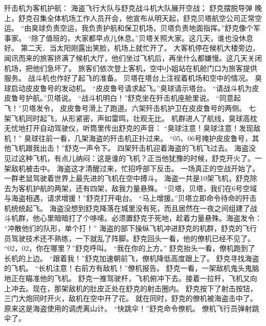 \documentclass[a4paper,12pt,UTF8,twoside]{ctexbook}
\begin{document}
        歼击机为客机护航： 
        海盗飞行大队与舒克战斗机大队展开空战； 
        舒克摆脱导弹   
        晚上，舒克召集全体机场工作人员开会，他宣布从明天起，舒克贝塔航空公司正常空运。 
        “由臭球负责空运，我负责护航和保卫机场，贝塔负责地面指挥。”舒克像个军事家。 
        “除了值班的，大家都早点儿休息。”贝塔关照大家。这几天，谁也没休息好。 
        第二天．当太阳刚露出笑脸，机场上就忙开了。 
        大客机停在候机大楼旁边，闻讯而来的旅客挤满了候机大厅，他们坐过飞机后，再坐什么都嫌慢。这几天关闭机场，把他们急坏了。 
        旅客们依次登上客机，空中小姐站在机舱门口为旅客提供服务。 
        战斗机也作好了起飞的准备。 
        贝塔在塔台上注视着机场和空中的情况。 
        臭球启动皮皮鲁号的发动机。 
        “皮皮鲁号请求起飞。”臭球请示塔台。 
        “请战斗机为皮皮鲁号护航。”贝塔说。 
        “战斗机明白！”舒克坐在歼击机座舱里说。 
        “同意起飞！”贝塔发令， 
        皮皮鲁号滑上了跑道。六架歼击机护卫在皮皮鲁号的两侧。 
        七架飞机同时起飞，从形紧密，声如雷鸣，壮观无比。 
        机群进人了航线，臭球高枕无忧地打开自动驾驶仪，听筒里传出舒克的声音： 
        “臭球注意！臭球注意！发现敌机！” 
        臭球往前一看，几架海盗的歼击机正扑过来。 
        “05、06号掩护皮皮鲁号，其他飞机跟我出击！”舒克一声令下。 
        四架歼击机迎着海盗的飞机飞过去。 
        海盗没见过这种飞机，有点儿纳闷：这是谁的飞机？正当他犹豫的时候，舒克开火了。一架敌机被击中。 
        海盗这才清醒过来，忙招呼部下反击。 
        一场真正的空战开始了。一群老鼠驾驶着世界上最先进的飞机在空中搏斗。 
        海盗一共是10架飞机，舒克除去为客机护航的两架，还有四架，敌我力量悬殊。 
        “贝塔，贝塔，我们在6号空域与海盗相遇，请求增援！”舒克打开电台。 
        “马上增援。”贝塔立即命令待命的歼击机统统起飞。 
        海盗没想到舒克降落在城里没有死，而且居然在一夜之间组建了战斗机群，他心里暗暗打了个哆嗦。必须置舒克于死地，趁着力量悬殊。海盗发令： 
        “冲散他们的队形，单个打！” 
        海盗的部下操纵飞机冲进舒克的机群，舒克的飞行员驾驶技术还不熟练，一下就乱了阵脚。舒克回头一看，他的僚机已经不见了。 
        “02，02，你在哪里？”舒克呼叫。 
        “我在你的上方。” 
        舒克抬头一看，僚机跑到了长机的上边。 
        “跟着我！”舒克加速朝前飞，僚机降低高度跟上了。 
        舒克寻找海盗的飞机。 
        “长机注意！右前方有敌机！”僚机报告。 
        舒克一看，一架敌机鬼头鬼脑地正在瞄准他的飞机。 
        舒克一推驾驶杆，飞机俯冲下去。接着一拉杆，飞机又向上冲去。现在，那架敌机的肚皮正处在舒克的射击圈内。 
        舒克按下了射击按钮，三门大炮同时开火，敌机在空中开了花。 
        就在同时，舒克的僚机被海盗击中了。原来这是海盗使用的调虎离山计。 
        “快跳伞！”舒克命令僚机。 
        僚机飞行员弹射跳伞了。 
\end{document}
